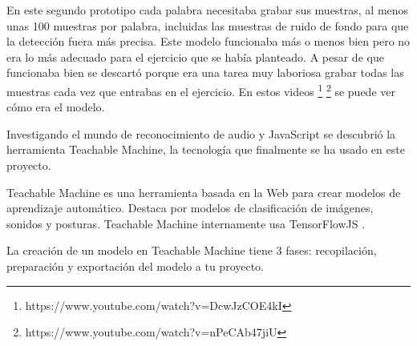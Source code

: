 En este segundo prototipo cada palabra necesitaba grabar sus muestras, al menos unas 100 muestras por palabra, incluidas las muestras de ruido de fondo para que la detección fuera más precisa. Este modelo funcionaba más o menos bien pero no era lo más adecuado para el ejercicio que se había planteado. A pesar de que funcionaba bien se descartó porque era una tarea muy laboriosa grabar todas las muestras cada vez que entrabas en el ejercicio. 
En estos videos \footnote{https://www.youtube.com/watch?v=DcwJzCOE4kI}
\footnote{https://www.youtube.com/watch?v=nPeCAb47jiU} se puede ver cómo era el modelo.

Investigando el mundo de reconocimiento de audio y JavaScript se descubrió la herramienta Teachable Machine, la tecnología  que finalmente se ha usado en este proyecto.

Teachable Machine es una herramienta basada en la Web para crear modelos de aprendizaje automático. Destaca por modelos de clasificación de imágenes, sonidos y posturas. Teachable Machine internamente usa TensorFlowJS . 

La creación de un modelo en Teachable Machine tiene 3 fases: recopilación, preparación y exportación del modelo a tu proyecto.

